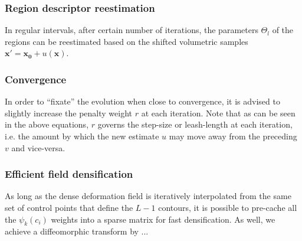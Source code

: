 \subsubsection{Region descriptor reestimation}
In regular intervals, after certain number of iterations,
the parameters $\Theta_l$ of the regions can be reestimated 
based on the shifted volumetric samples 
$\mathbf{x}' = \mathbf{x_0} + u(\mathbf{x})$.

\subsubsection{Convergence}
In order to ``fixate'' the evolution when close to convergence,
it is advised to slightly increase the penalty weight $r$ at each 
iteration. Note that as can be seen in the above equations, $r$ 
governs the step-size or leash-length at each iteration, i.e. the 
amount by which the new estimate $u$ may move away from the preceding 
$v$ and vice-versa. 

\subsubsection{Efficient field densification}
As long as the dense deformation field is iteratively interpolated
from the same set of control points that define the $L-1$ contours,
it is possible to pre-cache all the $\psi_k(c_i)$ weights into a
sparse matrix for fast densification. As well, we achieve a 
diffeomorphic transform by ... 
